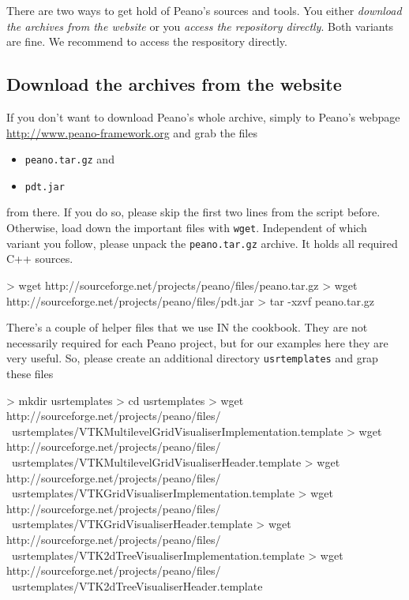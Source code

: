There are two ways to get hold of Peano's sources and tools. You either {\em
download the archives from the website} or you {\em access the repository
directly}.
Both variants are fine.
We recommend to access the respository directly.


\subsection{Download the archives from the website}

If you don't want to download Peano's whole archive, simply to Peano's webpage
\url{http://www.peano-framework.org} and grab the files
\begin{itemize}
  \item \texttt{peano.tar.gz} and
  \item \texttt{pdt.jar}
\end{itemize}
from there. If you do so, please skip the first two lines from the script
before. Otherwise, load down the important files with \texttt{wget}. 
Independent of which variant you follow, please unpack the \texttt{peano.tar.gz}
archive. 
It holds all required C++ sources.

\begin{code}
> wget http://sourceforge.net/projects/peano/files/peano.tar.gz
> wget http://sourceforge.net/projects/peano/files/pdt.jar
> tar -xzvf peano.tar.gz
\end{code}


\noindent
There's a couple of helper files that we use IN the
cookbook. 
They are not necessarily required for each Peano project, but for our examples
here they are very useful.
So, please create an additional directory \texttt{usrtemplates} and grap
these files

\begin{code}
> mkdir usrtemplates
> cd usrtemplates
> wget http://sourceforge.net/projects/peano/files/ \
  usrtemplates/VTKMultilevelGridVisualiserImplementation.template 
> wget http://sourceforge.net/projects/peano/files/ \
  usrtemplates/VTKMultilevelGridVisualiserHeader.template 
> wget http://sourceforge.net/projects/peano/files/ \
  usrtemplates/VTKGridVisualiserImplementation.template 
> wget http://sourceforge.net/projects/peano/files/ \
  usrtemplates/VTKGridVisualiserHeader.template 
> wget http://sourceforge.net/projects/peano/files/ \
  usrtemplates/VTK2dTreeVisualiserImplementation.template 
> wget http://sourceforge.net/projects/peano/files/ \
  usrtemplates/VTK2dTreeVisualiserHeader.template 
\end{code}

